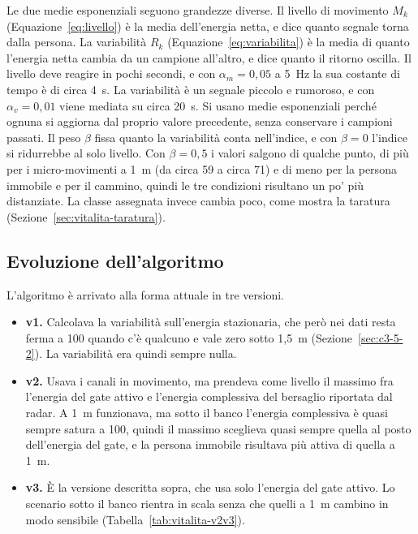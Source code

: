 Le due medie esponenziali seguono grandezze diverse. Il livello di movimento $M_k$ (Equazione~\ref{eq:livello}) è la media dell'energia netta, e dice quanto segnale torna dalla persona. La variabilità $R_k$ (Equazione~\ref{eq:variabilita}) è la media di quanto l'energia netta cambia da un campione all'altro, e dice quanto il ritorno oscilla. Il livello deve reagire in pochi secondi, e con $\alpha_m = 0{,}05$ a 5~Hz la sua costante di tempo è di circa 4~s. La variabilità è un segnale piccolo e rumoroso, e con $\alpha_v = 0{,}01$ viene mediata su circa 20~s. Si usano medie esponenziali perché ognuna si aggiorna dal proprio valore precedente, senza conservare i campioni passati. Il peso $\beta$ fissa quanto la variabilità conta nell'indice, e con $\beta = 0$ l'indice si ridurrebbe al solo livello. Con $\beta = 0{,}5$ i valori salgono di qualche punto, di più per i micro-movimenti a 1~m (da circa 59 a circa 71) e di meno per la persona immobile e per il cammino, quindi le tre condizioni risultano un po' più distanziate. La classe assegnata invece cambia poco, come mostra la taratura (Sezione~\ref{sec:vitalita-taratura}).

\subsection{Evoluzione dell'algoritmo}
\label{sec:vitalita-evoluzione}
L'algoritmo è arrivato alla forma attuale in tre versioni.

\begin{itemize}
    \item \textbf{v1.} Calcolava la variabilità sull'energia stazionaria, che però nei dati resta ferma a 100 quando c'è qualcuno e vale zero sotto 1,5~m (Sezione~\ref{sec:c3-5-2}). La variabilità era quindi sempre nulla.

    \item \textbf{v2.} Usava i canali in movimento, ma prendeva come livello il massimo fra l'energia del gate attivo e l'energia complessiva del bersaglio riportata dal radar. A 1~m funzionava, ma sotto il banco l'energia complessiva è quasi sempre satura a 100, quindi il massimo sceglieva quasi sempre quella al posto dell'energia del gate, e la persona immobile risultava più attiva di quella a 1~m.

    \item \textbf{v3.} È la versione descritta sopra, che usa solo l'energia del gate attivo. Lo scenario sotto il banco rientra in scala senza che quelli a 1~m cambino in modo sensibile (Tabella~\ref{tab:vitalita-v2v3}).
\end{itemize}

